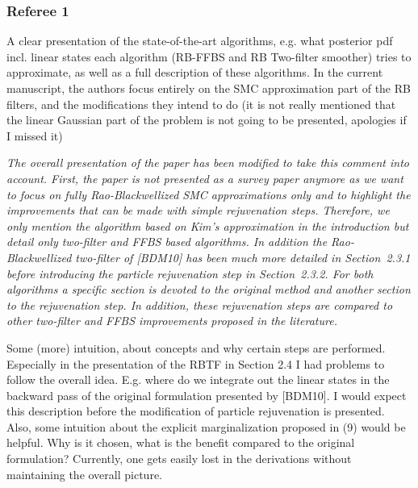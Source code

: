 \subsubsection*{Referee 1}
A clear presentation of the state-of-the-art algorithms, e.g. what posterior pdf incl. linear states each algorithm (RB-FFBS and RB Two-filter smoother) tries to approximate, as well as a full description of these algorithms. In the current manuscript, the authors focus entirely on the SMC approximation part of the RB filters, and the modifications they intend to do (it is not really mentioned that the linear Gaussian part of the problem is not going to be presented, apologies if I missed it)

\vspace{.2cm}

{\em
\noindent The overall presentation of the paper has been modified to take this comment into account. First, the paper is not presented as a survey paper anymore as we want to focus on fully Rao-Blackwellized SMC approximations only and to highlight the improvements that can be made with simple rejuvenation steps. Therefore, we only mention the algorithm based on Kim's approximation in the introduction but detail only two-filter and FFBS based algorithms. In addition the Rao-Blackwellized two-filter of [BDM10] has been much more detailed in Section~2.3.1 before introducing the particle rejuvenation step in Section~2.3.2. For both algorithms a specific section is devoted to the original method and another section to the rejuvenation step. In addition, these rejuvenation steps are compared to other two-filter and FFBS improvements proposed in the literature.
}

\vspace{.5cm}

\noindent Some (more) intuition, about concepts and why certain steps are performed. Especially in the presentation of the RBTF in Section 2.4 I had problems to follow the overall idea. E.g. where do we integrate out the linear states in the backward pass of the original formulation presented by [BDM10]. I would expect this description before the modification of particle rejuvenation is presented. Also, some intuition about the explicit marginalization proposed in (9) would be helpful. Why is it chosen, what is the benefit compared to the original formulation? Currently, one gets easily lost in the derivations without maintaining the overall picture. 

\vspace{.2cm}

